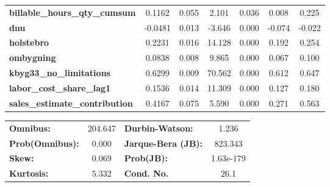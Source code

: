 \begin{center}
\begin{tabular}{lcccccc}
\textbf{billable\_hours\_qty\_cumsum}    &       0.1162  &        0.055     &     2.101  &         0.036        &        0.008    &        0.225     \\
\textbf{dnu}                             &      -0.0481  &        0.013     &    -3.646  &         0.000        &       -0.074    &       -0.022     \\
\textbf{holstebro}                       &       0.2231  &        0.016     &    14.128  &         0.000        &        0.192    &        0.254     \\
\textbf{ombygning}                       &       0.0838  &        0.008     &     9.865  &         0.000        &        0.067    &        0.100     \\
\textbf{kbyg33\_no\_limitations}         &       0.6299  &        0.009     &    70.562  &         0.000        &        0.612    &        0.647     \\
\textbf{labor\_cost\_share\_lag1}        &       0.1536  &        0.014     &    11.309  &         0.000        &        0.127    &        0.180     \\
\textbf{sales\_estimate\_contribution}   &       0.4167  &        0.075     &     5.590  &         0.000        &        0.271    &        0.563     \\
\bottomrule
\end{tabular}
\begin{tabular}{lclc}
\textbf{Omnibus:}       & 204.647 & \textbf{  Durbin-Watson:     } &     1.236  \\
\textbf{Prob(Omnibus):} &   0.000 & \textbf{  Jarque-Bera (JB):  } &   823.343  \\
\textbf{Skew:}          &   0.069 & \textbf{  Prob(JB):          } & 1.63e-179  \\
\textbf{Kurtosis:}      &   5.332 & \textbf{  Cond. No.          } &      26.1  \\
\bottomrule
\end{tabular}
\end{center}